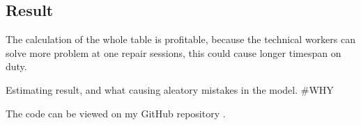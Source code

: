 	\subsection{Result}
The calculation of the whole table is profitable, because the technical workers can solve more problem at one repair sessions, this could cause longer timespan on duty.

Estimating result, and what causing aleatory mistakes in the model. 
\#WHY

The code can be viewed on my GitHub repository \cite{GitHub_FP_RUL}.